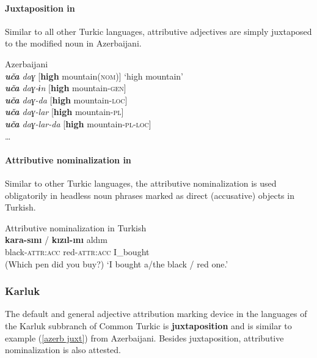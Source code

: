 \paragraph{Juxtaposition in } Similar to all other Turkic languages, attributive adjectives are simply juxtaposed to the modified noun in Azerbaijani.
\begin{exe}
\ex 
\rm{Azerbaijani \citep[59–60]{siraliev-etal1971}}\\
\textit{\textbf{uča} daɣ} 		\rm{[\textbf{high} mountain(\textsc{nom})]}	‘high mountain’\\
\textit{\textbf{uča} daɣ-ɨn} 		\rm{[\textbf{high} mountain-\textsc{gen}]}\\
\textit{\textbf{uča} daɣ-da} 	\rm{[\textbf{high} mountain-\textsc{loc}]}\\
\textit{\textbf{uča} daɣ-lar} 	\rm{[\textbf{high} mountain-\textsc{pl}]}\\
\textit{\textbf{uča} daɣ-lar-da} 	\rm{[\textbf{high} mountain-\textsc{pl}-\textsc{loc}]}\\
\dots \label{azerb juxt}
\end{exe}

\paragraph{Attributive nominalization in }\label{turkish synchr}
Similar to other Turkic languages, the attributive nominalization is used obligatorily in headless noun phrases marked as direct (accusative) objects in Turkish.
\begin{exe}
\ex 
\label{turkish headless acc}	
\rm{Attributive nominalization in Turkish \citep[7]{benzing1993b}}\\ 
\gll	\textbf{kara-sını} / \textbf{kızıl-ını} aldım\\
 	black-\textsc{attr:acc} { } red-\textsc{attr:acc} I\_bought\\
\glt 	(Which pen did you buy?) ‘I bought a/the black / red one.’
\end{exe}
 
\subsubsection{Karluk}
The default and general adjective attribution marking device in the languages of the Karluk subbranch of Common Turkic is \textbf{juxtaposition} and is similar to example (\ref{azerb juxt}) from Azerbaijani. Besides juxtaposition, attributive nominalization is also attested.

